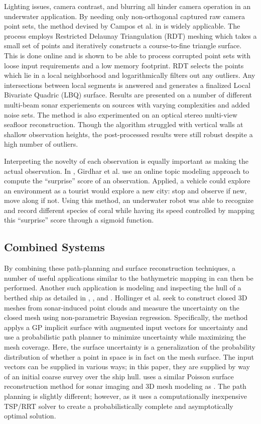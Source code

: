 \documentclass[double,12pt]{beavtex}
\begin{document}
Lighting issues, camera contrast, and blurring all hinder camera operation in an underwater application. By needing only non-orthogonal captured raw camera point sets, the method devised by Campos et al. in \cite{campos} is widely applicable. The process employs Restricted Delaunay Triangulation (RDT) meshing which takes a small set of points and iteratively constructs a course-to-fine triangle surface. This is done online and is shown to be able to process corrupted point sets with loose input requirements and a low memory footprint. RDT selects the points which lie in a local neighborhood and logarithmically filters out any outliers. Any intersections between local segments is answered and generates a finalized Local Bivariate Quadric (LBQ) surface. Results are presented on a number of different multi-beam sonar experiements on sources with varying complexities and added noise sets. The method is also experimented on an optical stereo multi-view seafloor reconstruction. Though the algorithm struggled with vertical walls at shallow observation heights, the post-processed results were still robust despite a high number of outliers.

Interpreting the novelty of each observation is equally important as making the actual observation. In \cite{girdhar}, Girdhar et al. use an online topic modeling approach to compute the “surprise” score of an observation. Applied, a vehicle could explore an environment as a tourist would explore a new city: stop and observe if new, move along if not. Using this method, an underwater robot was able to recognize and record different species of coral while having its speed controlled by mapping this “surprise” score through a sigmoid function.
 
\subsection{Combined Systems}
By combining these path-planning and surface reconstruction techniques, a number of useful applications similar to the bathymetric mapping in \cite{galceran} can then be performed. Another such application is modeling and inspecting the hull of a berthed ship as detailed in \cite{geoffadapt}, \cite{geoffuncertainty}, and \cite{hover}. Hollinger et al. seek to construct closed 3D meshes from sonar-induced point clouds and measure the uncertainty on the closed mesh using non-parametric Bayesian regression. Specifically, the method applys a GP implicit surface with augmented input vectors for uncertainty and use a probabilistic path planner to minimize uncertainty while maximizing the mesh coverage. Here, the surface uncertainty is a generalization of the probability distribution of whether a point in space is in fact on the mesh surface. The input vectors can be supplied in various ways; in this paper, they are supplied by way of an initial coarse survey over the ship hull. \cite{hover} uses a similar Poisson surface reconstruction method for sonar imaging and 3D mesh modeling as \cite{geoffadapt}. The path planning is slightly different; however, as it uses a computationally inexpensive TSP/RRT solver to create a probabilistically complete and asymptotically optimal solution.
\end{document}
